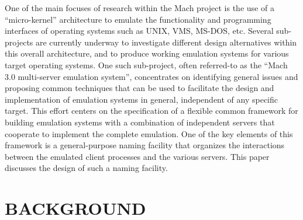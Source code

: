 One of the main focuses of research within the Mach project is the use
of a ``micro-kernel'' architecture to emulate the functionality and
programming interfaces of operating systems such as UNIX, VMS, MS-DOS,
etc.\cite{RASHID89} Several sub-projects are currently underway to
investigate different design alternatives within this overall
architecture, and to produce working emulation systems for various
target operating systems. One such sub-project, often referred-to as
the ``Mach 3.0 multi-server emulation system'', concentrates on
identifying general issues and proposing common techniques that can be
used to facilitate the design and implementation of emulation systems
in general, independent of any specific target. This effort centers on
the specification of a flexible common framework for building
emulation systems with a combination of independent servers that
cooperate to implement the complete emulation.  One of the key
elements of this framework is a general-purpose naming facility that
organizes the interactions between the emulated client processes and
the various servers. This paper discusses the design of such a naming
facility.

\section{BACKGROUND}

